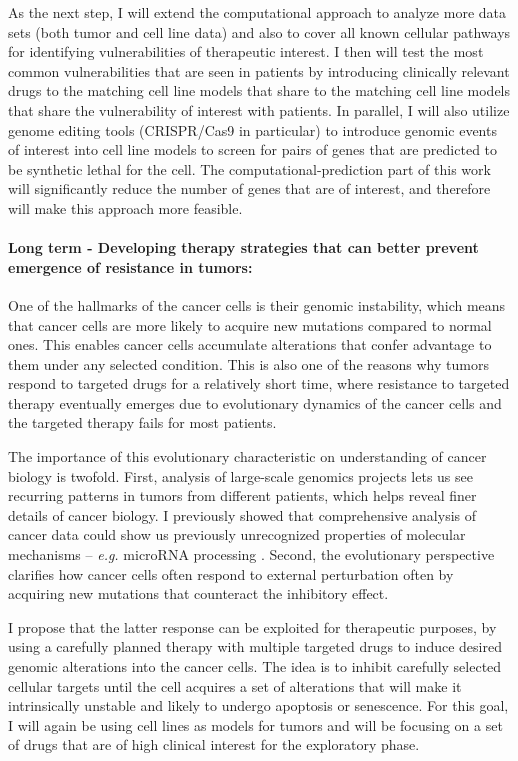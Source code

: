 \documentclass[11pt,letterpaper]{article}
\begin{document}
As the next step, I will extend the computational approach to analyze more data sets (both tumor and cell line data) and also to cover all known cellular pathways for identifying vulnerabilities of therapeutic interest.
I then will test the most common vulnerabilities that are seen in patients by introducing clinically relevant drugs to the matching cell line models that share to the matching cell line models that share the vulnerability of interest with patients.
In parallel, I will also utilize genome editing tools (CRISPR/Cas9 in particular)
to introduce genomic events of interest into cell line models to screen for pairs of genes that are predicted to be synthetic lethal for the cell.
The computational-prediction part of this work will significantly reduce the number of genes that are of interest, 
and therefore will make this approach more feasible.

\paragraph{Long term - Developing therapy strategies that can better prevent emergence of resistance in tumors:}
One of the hallmarks of the cancer cells is their genomic instability, 
which means that cancer cells are more likely to acquire new mutations compared to normal ones.
This enables cancer cells accumulate alterations that confer advantage to them under any selected condition.
This is also one of the reasons why tumors respond to targeted drugs for a relatively short time,
where resistance to targeted therapy eventually emerges due to evolutionary dynamics of the cancer cells
and the targeted therapy fails for most patients.

The importance of this evolutionary characteristic on understanding of cancer biology is twofold.
First, analysis of large-scale genomics projects lets us see recurring patterns in tumors from different patients, which helps reveal finer details of cancer biology.
I previously showed that comprehensive analysis of cancer data could show us previously unrecognized properties of molecular mechanisms -- \textit{e.g.} microRNA processing \cite{aksoy2014cancer}.
Second, the evolutionary perspective clarifies how cancer cells often respond to external perturbation often by acquiring new mutations that counteract the inhibitory effect.

I propose that the latter response can be exploited for therapeutic purposes,
by using a carefully planned therapy with multiple targeted drugs to induce desired genomic alterations into the cancer cells.
The idea is to inhibit carefully selected cellular targets until the cell acquires a set of alterations that will make it intrinsically unstable and likely to undergo apoptosis or senescence.
For this goal, I will again be using cell lines as models for tumors
and will be focusing on a set of drugs that are of high clinical interest for the exploratory phase.

\clearpage

\footnotesize{
{}
}
\end{document}

